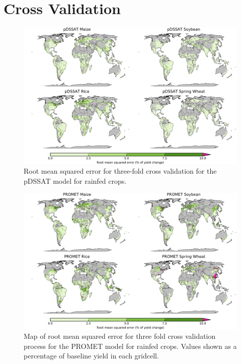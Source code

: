 \documentclass[10pt]{article}
\begin{document}
\clearpage
\section{Cross Validation}

\begin{figure}[h!]
\centering
\includegraphics[width=15.5cm]{pDSSAT_spatial_MSE_ton_ha.png}
\caption{Root mean squared error for three-fold cross validation for the pDSSAT model for rainfed crops.}
\label{fig:pdssatrmse}
\end{figure}

\begin{figure}[h!]
\centering
\includegraphics[width=15.5cm]{PROMET_spatial_MSE_ton_ha.png}
\caption{Map of root mean squared error for three fold cross validation process for the PROMET model for rainfed crops. Values shown as a percentage of baseline yield in each gridcell.}
\label{fig:pdssatrmse}
\end{figure}
\end{document}
